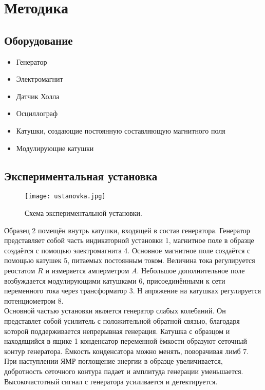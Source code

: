 \documentclass[a4paper, 14pt]{article}
\begin{document}
\section*{\textcolor{header}{Методика}}

\subsection*{\textcolor{sub_header}{Оборудование}}
\begin{itemize}
    \item Генератор
    \item Электромагнит 
    \item Датчик Холла
    \item Осциллограф 
    \item Катушки, создающие постоянную составляющую магнитного поля
    \item Модулирующие катушки 
\end{itemize}

\subsection*{\textcolor{sub_header}{Экспериментальная установка}}

\begin{figure}[htbp]
    \centering
    \texttt{[image: ustanovka.jpg]}
    \caption{Схема экспериментальной установки.}
    \label{fig:ustanovka}
\end{figure}


Образец 2 помещён внутрь катушки, входящей в состав генератора. 
Генератор представляет собой часть индикаторной установки 1, магнитное поле в образце создаётся с помощью электромагнита 4.
Основное магнитное поле создаётся с помощью катушек 5, питаемых постоянным током.
Величина тока регулируется реостатом $R$ и измеряется амперметром $A$. 
Небольшое дополнительное поле возбуждается модулирующими катушками 6, присоединёнными к сети переменного тока через трансформатор 3. Н
апряжение на катушках регулируется потенциометром 8.\\

Основной частью установки является генератор слабых колебаний.
Он представлет собой усилитель с положительной обратной связью, благодаря которой поддерживается непрерывная генерация.
Катушка с образцом и находящийся в ящике 1 конденсатор переменной ёмкости образуют сеточный контур генератора. 
Ёмкость конденсатора можно менять, поворачивая лимб 7. 
При наступлении ЯМР поглощение энергии в образце увеличивается, добротность сеточного контура падает и амплитуда генерации уменьшается. 
Высокочастотный сигнал с генератора усиливается и детектируется.\\
\end{document}
